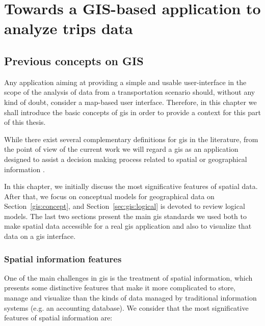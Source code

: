 \part{Towards a GIS-based application to analyze trips data} \label{part:gis}
\chapter{Previous concepts on GIS}
\label{ch:gis:prev}
    Any application aiming at providing a simple and usable \mbox{user-interface} in the scope of the analysis of data from a transportation scenario should, without any kind of doubt, consider a \mbox{map-based} user interface.
    Therefore, in this chapter we shall introduce the basic concepts of \acrfull{gis} in order to provide a context for this part of this thesis.
    
    While there exist several complementary definitions for \gls{gis} in the literature, from the point of view of the current work we will regard a \gls{gis} as an application designed to assist a decision making process related to spatial or geographical information \cite{harmon2003design,longley2015geographic}.
    
    In this chapter, we initially discuss the most significative features of spatial data. After that, we focus on conceptual models for geographical data on Section~\ref{gis:concept}, and Section~\ref{sec:gis:logical} is devoted to review logical models. The last two sections present the main \gls{gis} standards we used both to make spatial data accessible for a real \gls{gis} application and also to visualize that data on a \gls{gis} interface.
    
    \section{Spatial information features}
    One of the main challenges in \gls{gis} is the treatment of spatial information, which presents some distinctive features that make it more complicated to store, manage and visualize than the kinds of data managed by traditional information systems (e.g. an accounting database). We consider that the most significative features of spatial information are:
    
